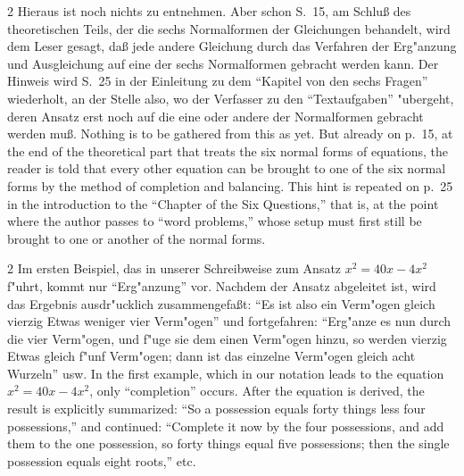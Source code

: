 \documentclass[10pt,a4paper]{article}
\renewcommand{\switchcolumn}{\syncronize\nointerlineskip\columnbreak}
\newcommand{\enquote}[1]{``#1''}
\begin{document}
\begin{paracol}{2}
Hieraus ist noch nichts zu entnehmen. Aber schon S.\ 15, am Schlu\ss{} des theoretischen Teils, der die sechs Normalformen der Gleichungen behandelt, wird dem Leser gesagt, da\ss{} jede andere Gleichung durch das Verfahren der Erg"anzung und Ausgleichung auf eine der sechs Normalformen gebracht werden kann. Der Hinweis wird S.\ 25 in der Einleitung zu dem \enquote{Kapitel von den sechs Fragen} wiederholt, an der Stelle also, wo der Verfasser zu den \enquote{Textaufgaben} "ubergeht, deren Ansatz erst noch auf die eine oder andere der Normalformen gebracht werden mu\ss{}.
\switchcolumn
Nothing is to be gathered from this as yet. But already on p.\ 15, at the end of the theoretical part that treats the six normal forms of equations, the reader is told that every other equation can be brought to one of the six normal forms by the method of completion and balancing. This hint is repeated on p.\ 25 in the introduction to the ``Chapter of the Six Questions,'' that is, at the point where the author passes to ``word problems,'' whose setup must first still be brought to one or another of the normal forms.
\end{paracol}

\begin{paracol}{2}
Im ersten Beispiel, das in unserer Schreibweise zum Ansatz $x^{2} = 40x - 4x^{2}$ f"uhrt, kommt nur \enquote{Erg"anzung} vor. Nachdem der Ansatz abgeleitet ist, wird das Ergebnis ausdr"ucklich zusammengefa\ss{}t: \enquote{Es ist also ein Verm"ogen gleich vierzig Etwas weniger vier Verm"ogen} und fortgefahren: \enquote{Erg"anze es nun durch die vier Verm"ogen, und f"uge sie dem einen Verm"ogen hinzu, so werden vierzig Etwas gleich f"unf Verm"ogen; dann ist das einzelne Verm"ogen gleich acht Wurzeln} usw.
\switchcolumn
In the first example, which in our notation leads to the equation $x^{2} = 40x - 4x^{2}$, only ``completion'' occurs. After the equation is derived, the result is explicitly summarized: ``So a possession equals forty things less four possessions,'' and continued: ``Complete it now by the four possessions, and add them to the one possession, so forty things equal five possessions; then the single possession equals eight roots,'' etc.
\end{paracol}
\end{document}
